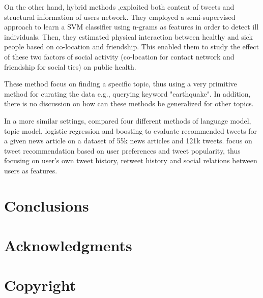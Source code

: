 \documentclass[letterpaper]{article}
\begin{document}
On the other hand, hybrid methods \cite{sadilek} ,exploited both content of tweets and structural information of users network. They employed a semi-supervised approach to learn a SVM classifier using n-grams as features in order to detect ill individuals. Then, they estimated physical interaction between healthy and sick people based on co-location and friendship. This enabled them to study the effect of these two factors of social activity (co-location for contact network and friendship for social ties) on public health.

These method focus on finding a specific topic, thus using a very primitive method for curating the data e.g., querying keyword "earthquake". In addition, there is no discussion on how can these methods be generalized for other topics.

In a more similar settings, \cite{Krestel} compared four different methods of language model, topic model, logistic regression and boosting to evaluate recommended tweets for a given news article on a dataset of 55k news articles and 121k tweets. \cite{Yan,chen} focus on tweet recommendation based on user preferences and tweet popularity, thus focusing on user's own tweet history, retweet history and social relations between users as features. 




\section{Conclusions}

\section{Acknowledgments}

\section{Copyright}



\end{document}
